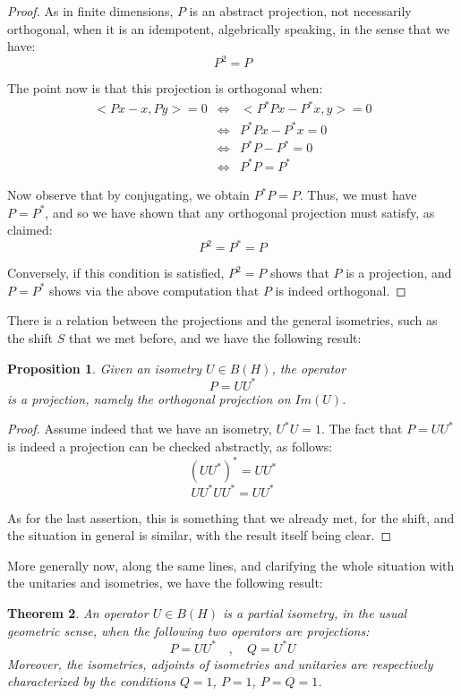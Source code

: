 \documentclass[12pt]{amsbook}
\newtheorem{theorem}{Theorem}[chapter]
\newtheorem{proposition}[theorem]{Proposition}
\begin{document}
\begin{proof}
As in finite dimensions, $P$ is an abstract projection, not necessarily orthogonal, when it is an idempotent, algebrically speaking, in the sense that we have:
$$P^2=P$$

The point now is that this projection is orthogonal when:
\begin{eqnarray*}
<Px-x,Py>=0
&\iff&<P^*Px-P^*x,y>=0\\
&\iff&P^*Px-P^*x=0\\
&\iff&P^*P-P^*=0\\
&\iff&P^*P=P^*
\end{eqnarray*}

Now observe that by conjugating, we obtain $P^*P=P$. Thus, we must have $P=P^*$, and so we have shown that any orthogonal projection must satisfy, as claimed:
$$P^2=P^*=P$$

Conversely, if this condition is satisfied, $P^2=P$ shows that $P$ is a projection, and $P=P^*$ shows via the above computation that $P$ is indeed orthogonal.
\end{proof}

There is a relation between the projections and the general isometries, such as the shift $S$ that we met before, and we have the following result:

\begin{proposition}
Given an isometry $U\in B(H)$, the operator 
$$P=UU^*$$
is a projection, namely the orthogonal projection on $Im(U)$.
\end{proposition}

\begin{proof}
Assume indeed that we have an isometry, $U^*U=1$. The fact that $P=UU^*$ is indeed a projection can be checked abstractly, as follows:
$$(UU^*)^*=UU^*$$
$$UU^*UU^*=UU^*$$

As for the last assertion, this is something that we already met, for the shift, and the situation in general is similar, with the result itself being clear.
\end{proof}

More generally now, along the same lines, and clarifying the whole situation with the unitaries and isometries, we have the following result:


\begin{theorem}
An operator $U\in B(H)$ is a partial isometry, in the usual geometric sense, when the following two operators are projections:
$$P=UU^*\quad,\quad 
Q=U^*U$$
Moreover, the isometries, adjoints of isometries and unitaries are respectively characterized by the conditions $Q=1$, $P=1$, $P=Q=1$.
\end{theorem}
\end{document}
